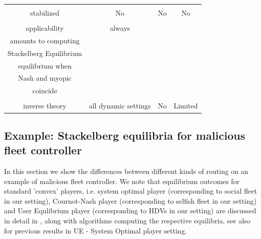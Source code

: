 \documentclass[a4paper,11pt]{article}
\newtheorem{remark}[theorem]{Remark}
\begin{document}
\begin{table}[h!]
\begin{tabular}{|c||c|c|c|}
\hline
\makecell {Uniqueness when \\ stabilized} & No & No & No 
\\
\Xhline{3\arrayrulewidth}
\makecell{Inverse theory\\applicability} & always & \makecell{Trivializes \\ amounts to computing\\ Stackelberg Equilibrium } & \makecell{Only at \\ equilibrium when \\ Nash and myopic \\ coincide}
\\
\hline
\makecell{Usefulness of \\inverse theory} &  all dynamic settings & No & Limited\\
\hline
\end{tabular}
\end{table}



\subsection{Example: Stackelberg equilibria for malicious fleet controller}



In this section we show the differences between different kinds of routing on an example of malicious fleet controller. We note that equilibrium outcomes for standard 'convex' players, i.e. system optimal player (corresponding to social fleet in our setting), Cournot-Nash player (corresponding to selfish fleet in our setting) and  User Equlibrium player (corresponding to HDVs in our setting) are discussed in detail in \cite{Yang2007}, along with algorithms computing the respective equilibria, see also \cite{VanVurenVliet} for previous results in UE - System Optimal player setting.   
\end{document}
